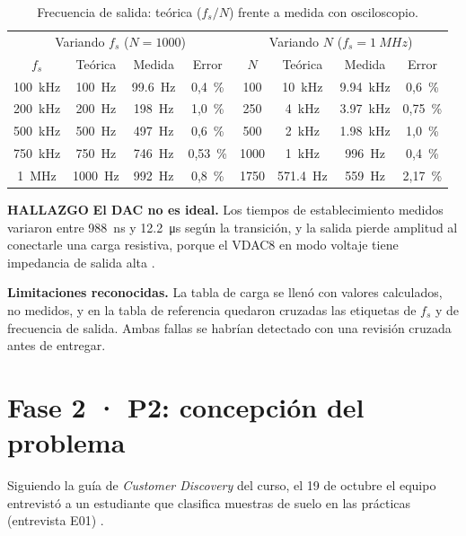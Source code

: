 \documentclass[11pt,a4paper]{article}
\newcommand{\etq}[2]{\colorbox{#1!15}{\textcolor{#1}{\scriptsize\bfseries #2}}}
\newcommand{\thal}{\etq{pend}{HALLAZGO}}
\begin{document}
\begin{table}[H]\centering\small
\caption{Frecuencia de salida: teórica ($f_s/N$) frente a medida con osciloscopio.}
\begin{tabular}{cccc|cccc}
\toprule
\multicolumn{4}{c|}{Variando $f_s$ ($N=1000$)} & \multicolumn{4}{c}{Variando $N$ ($f_s=\SI{1}{MHz}$)} \\
$f_s$ & Teórica & Medida & Error & $N$ & Teórica & Medida & Error \\
\midrule
\SI{100}{kHz} & \SI{100}{Hz} & \SI{99.6}{Hz} & 0,4~\% & 100 & \SI{10}{kHz} & \SI{9.94}{kHz} & 0,6~\% \\
\SI{200}{kHz} & \SI{200}{Hz} & \SI{198}{Hz} & 1,0~\% & 250 & \SI{4}{kHz} & \SI{3.97}{kHz} & 0,75~\% \\
\SI{500}{kHz} & \SI{500}{Hz} & \SI{497}{Hz} & 0,6~\% & 500 & \SI{2}{kHz} & \SI{1.98}{kHz} & 1,0~\% \\
\SI{750}{kHz} & \SI{750}{Hz} & \SI{746}{Hz} & 0,53~\% & 1000 & \SI{1}{kHz} & \SI{996}{Hz} & 0,4~\% \\
\SI{1}{MHz} & \SI{1000}{Hz} & \SI{992}{Hz} & 0,8~\% & 1750 & \SI{571.4}{Hz} & \SI{559}{Hz} & 2,17~\% \\
\bottomrule
\end{tabular}
\end{table}

\thal{} \textbf{El DAC no es ideal.} Los tiempos de establecimiento medidos variaron entre \SI{988}{ns} y \SI{12.2}{\micro s} según la transición, y la salida pierde amplitud al conectarle una carga resistiva, porque el VDAC8 en modo voltaje tiene impedancia de salida alta \cite{psoc}.

\textbf{Limitaciones reconocidas.} La tabla de carga se llenó con valores calculados, no medidos, y en la tabla de referencia quedaron cruzadas las etiquetas de $f_s$ y de frecuencia de salida. Ambas fallas se habrían detectado con una revisión cruzada antes de entregar.

\section{Fase 2 · P2: concepción del problema}\label{sec:f2}
Siguiendo la guía de \emph{Customer Discovery} del curso, el 19 de octubre el equipo entrevistó a un estudiante que clasifica muestras de suelo en las prácticas (entrevista E01) \cite{e01}.
\end{document}
